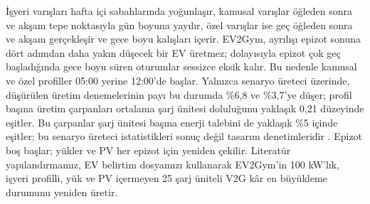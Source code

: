 İşyeri varışları hafta içi sabahlarında yoğunlaşır, kamusal varışlar öğleden sonra ve akşam tepe noktasıyla gün boyuna yayılır, özel varışlar ise geç öğleden sonra ve akşam gerçekleşir ve gece boyu kalışları içerir.
EV2Gym, ayrılışı epizot sonuna dört adımdan daha yakın düşecek bir EV üretmez; dolayısıyla epizot çok geç başladığında gece boyu süren oturumlar sessizce eksik kalır.
Bu nedenle kamusal ve özel profiller 05:00 yerine 12:00'de başlar.
Yalnızca senaryo üreteci üzerinde, düşürülen üretim denemelerinin payı bu durumda \%6,8 ve \%3,7'ye düşer; profil başına üretim çarpanları ortalama şarj ünitesi doluluğunu yaklaşık 0,21 düzeyinde eşitler.
Bu çarpanlar şarj ünitesi başına enerji talebini de yaklaşık \%5 içinde eşitler; bu senaryo üreteci istatistikleri sonuç değil tasarım denetimleridir .
Epizot boş başlar; yükler ve PV her epizot için yeniden çekilir.
Literatür yapılandırmamız, EV belirtim dosyamızı kullanarak EV2Gym'in 100 kW'lık, işyeri profilli, yük ve PV içermeyen 25 şarj üniteli V2G kâr en büyükleme durumunu yeniden üretir.

